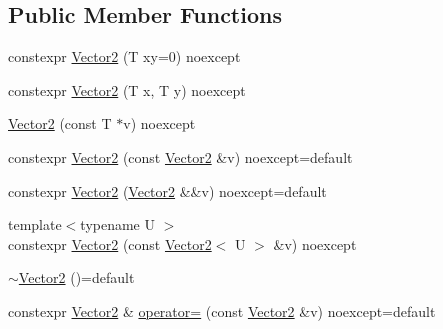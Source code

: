 \subsection*{Public Member Functions}
\begin{DoxyCompactItemize}
\item 
constexpr \hyperlink{structmage_1_1_vector2_3_01_t_00_01typename_01std_1_1enable__if__t_3_01std_1_1is__arithmetic__v_3_01_t_01_4_01_4_01_4_aaf3e924cfd222f8947bbd9f2333b18d8}{Vector2} (T xy=0) noexcept
\item 
constexpr \hyperlink{structmage_1_1_vector2_3_01_t_00_01typename_01std_1_1enable__if__t_3_01std_1_1is__arithmetic__v_3_01_t_01_4_01_4_01_4_a53a1d3a57be55e3560ca42d27240e158}{Vector2} (T x, T y) noexcept
\item 
\hyperlink{structmage_1_1_vector2_3_01_t_00_01typename_01std_1_1enable__if__t_3_01std_1_1is__arithmetic__v_3_01_t_01_4_01_4_01_4_af1c1787ee4784719430ecd542e8699bd}{Vector2} (const T $\ast$v) noexcept
\item 
constexpr \hyperlink{structmage_1_1_vector2_3_01_t_00_01typename_01std_1_1enable__if__t_3_01std_1_1is__arithmetic__v_3_01_t_01_4_01_4_01_4_a1d8db503facc6869fb7afbf7e9344b12}{Vector2} (const \hyperlink{structmage_1_1_vector2}{Vector2} \&v) noexcept=default
\item 
constexpr \hyperlink{structmage_1_1_vector2_3_01_t_00_01typename_01std_1_1enable__if__t_3_01std_1_1is__arithmetic__v_3_01_t_01_4_01_4_01_4_aab19ae0f522e4292dc53322a5a3e332c}{Vector2} (\hyperlink{structmage_1_1_vector2}{Vector2} \&\&v) noexcept=default
\item 
{\footnotesize template$<$typename U $>$ }\\constexpr \hyperlink{structmage_1_1_vector2_3_01_t_00_01typename_01std_1_1enable__if__t_3_01std_1_1is__arithmetic__v_3_01_t_01_4_01_4_01_4_a4d21fff4a3bef3ed8c75851ca467e578}{Vector2} (const \hyperlink{structmage_1_1_vector2}{Vector2}$<$ U $>$ \&v) noexcept
\item 
\hyperlink{structmage_1_1_vector2_3_01_t_00_01typename_01std_1_1enable__if__t_3_01std_1_1is__arithmetic__v_3_01_t_01_4_01_4_01_4_acd350f63542ac5349d84fb380cff50de}{$\sim$\+Vector2} ()=default
\item 
constexpr \hyperlink{structmage_1_1_vector2}{Vector2} \& \hyperlink{structmage_1_1_vector2_3_01_t_00_01typename_01std_1_1enable__if__t_3_01std_1_1is__arithmetic__v_3_01_t_01_4_01_4_01_4_a3f6a50c62c79f89e43df56ae9a187c98}{operator=} (const \hyperlink{structmage_1_1_vector2}{Vector2} \&v) noexcept=default
\item 

\end{DoxyCompactItemize}

